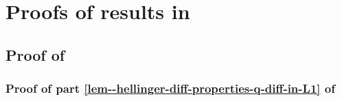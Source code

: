 
\section{Proofs of results in }

\subsection{Proof of }
\label{sec--prf--lem--hellinger-diff-properties}

\subsubsection{Proof of part \ref{lem--hellinger-diff-properties-q-diff-in-L1}
of }

